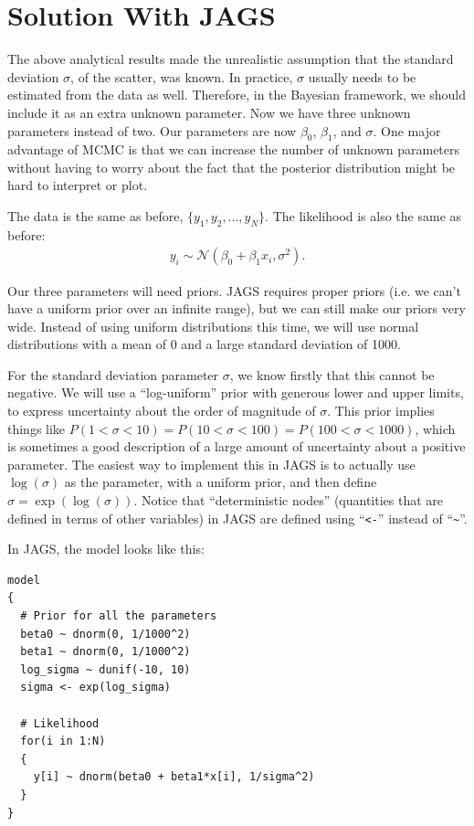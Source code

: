 \section{Solution With JAGS}
The above analytical results made the unrealistic assumption that the standard
deviation $\sigma$, of the scatter, was known. In practice, $\sigma$ usually needs to be
estimated from the data as well. Therefore, in the Bayesian framework, we should
include it as an extra unknown parameter. Now we have three unknown parameters instead
of two. Our parameters are now $\beta_0$, $\beta_1$, and $\sigma$.
One major advantage of MCMC is that we can increase the number of unknown parameters
without having to worry about the fact that the posterior distribution might
be hard to interpret or plot.

The data is the same as before, $\{y_1, y_2, ..., y_N\}$. The likelihood is
also the same as before:
\begin{eqnarray}
y_i \sim \mathcal{N}(\beta_0 + \beta_1 x_i, \sigma^2).
\end{eqnarray}

Our three parameters will need priors. JAGS requires proper priors (i.e. we
can't have a uniform prior over an infinite range), but we can still make our
priors very wide. Instead of using uniform distributions this time,
we will use normal distributions with a mean of 0 and a large standard deviation
of 1000.

For the standard deviation parameter $\sigma$, we know firstly that this cannot
be negative. We will use a ``log-uniform'' prior with generous lower and upper limits,
to express uncertainty about the order of magnitude of $\sigma$. This prior implies
things like $P(1 < \sigma < 10) = P(10 < \sigma < 100) = P(100 < \sigma < 1000)$,
which is sometimes a good description of a large amount of uncertainty about
a positive parameter. The easiest way to implement this in JAGS is to actually
use $\log(\sigma)$ as the parameter, with a uniform prior, and then define
$\sigma = \exp\left(\log(\sigma)\right)$. Notice that ``deterministic nodes''
(quantities that are defined in terms of other variables) in JAGS are defined
using ``{\tt <-}'' instead of ``{\tt \~{ }}''.

In JAGS, the model looks like this:
\begin{verbatim}
model
{
  # Prior for all the parameters
  beta0 ~ dnorm(0, 1/1000^2)
  beta1 ~ dnorm(0, 1/1000^2)
  log_sigma ~ dunif(-10, 10)
  sigma <- exp(log_sigma)

  # Likelihood
  for(i in 1:N)
  {
    y[i] ~ dnorm(beta0 + beta1*x[i], 1/sigma^2)
  }
}
\end{verbatim}

